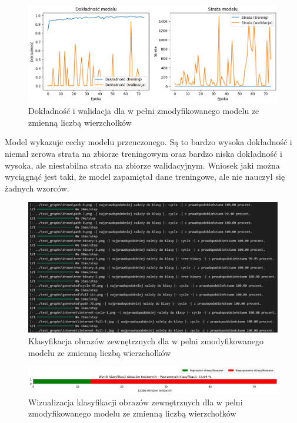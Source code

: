 \begin{figure}[ht]
	\centering
	\includegraphics[width=14cm]{resources/tests/images/v4/multiple_edges_img.png}
	\caption{Dokładność i walidacja dla w pełni zmodyfikowanego modelu ze zmienną liczbą wierzchołków}
	\label{Fig:tests-var-2a}
\end{figure}
\FloatBarrier

Model wykazuje cechy modelu przeuczonego.
Są to bardzo wysoka dokładność i niemal zerowa strata na zbiorze treningowym
oraz bardzo niska dokładność i wysoka, ale niestabilna strata na zbiorze walidacyjnym.
Wniosek jaki można wyciągnąć jest taki, że model zapamiętał dane treningowe, ale nie nauczył się żadnych wzorców.

\begin{figure}[ht]
	\centering
	\includegraphics[width=14cm]{resources/tests/images/v4/multiple_edges_txt.png}
	\caption{Klasyfikacja obrazów zewnętrznych dla w pelni zmodyfikowanego modelu ze zmienną liczbą wierzchołków}
	\label{Fig:tests-var-2b}
\end{figure}
\FloatBarrier

\begin{figure}[ht]
	\centering
	\includegraphics[width=14cm]{resources/tests/images/v4/multiple_edges_bar.png}
	\caption{Wizualizacja klasyfikacji obrazów zewnętrznych dla w pelni zmodyfikowanego modelu ze zmienną liczbą wierzchołków}
	\label{Fig:tests-var-2c}
\end{figure}
\FloatBarrier

